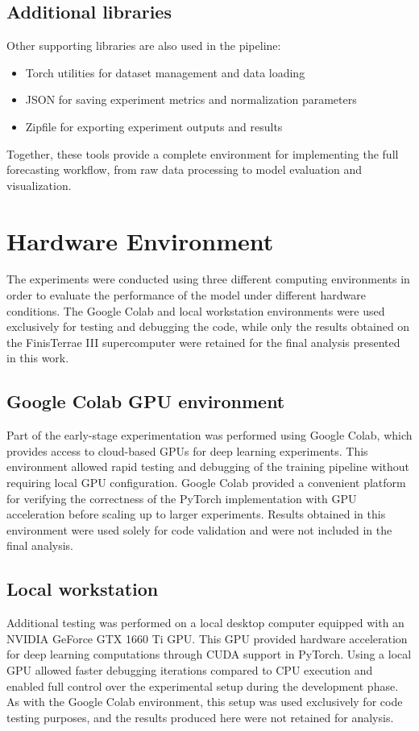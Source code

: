 \subsection{Additional libraries}
Other supporting libraries are also used in the pipeline:
\begin{itemize}
    \item Torch utilities for dataset management and data loading
    \item JSON for saving experiment metrics and normalization parameters
    \item Zipfile for exporting experiment outputs and results
\end{itemize}

Together, these tools provide a complete environment for implementing the full forecasting workflow, from raw data processing to model evaluation and visualization.
\section{Hardware Environment}
The experiments were conducted using three different computing environments in order to evaluate the performance of the model under different hardware conditions. The Google Colab and local workstation environments were used exclusively for testing and debugging the code, while only the results obtained on the FinisTerrae III supercomputer were retained for the final analysis presented in this work.

\subsection{Google Colab GPU environment}
Part of the early-stage experimentation was performed using Google Colab, which provides access to cloud-based GPUs for deep learning experiments. This environment allowed rapid testing and debugging of the training pipeline without requiring local GPU configuration. Google Colab provided a convenient platform for verifying the correctness of the PyTorch implementation with GPU acceleration before scaling up to larger experiments. Results obtained in this environment were used solely for code validation and were not included in the final analysis.

\subsection{Local workstation}
Additional testing was performed on a local desktop computer equipped with an NVIDIA GeForce GTX 1660 Ti GPU. This GPU provided hardware acceleration for deep learning computations through CUDA support in PyTorch.
Using a local GPU allowed faster debugging iterations compared to CPU execution and enabled full control over the experimental setup during the development phase. As with the Google Colab environment, this setup was used exclusively for code testing purposes, and the results produced here were not retained for analysis.

